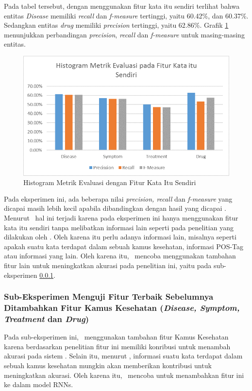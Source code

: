 	Pada tabel tersebut, dengan menggunakan fitur kata itu sendiri terlihat bahwa entitas \textit{Disease} memiliki \textit{recall} dan \textit{f-measure} tertinggi, yaitu 60.42\%, dan 60.37\%. Sedangkan entitas \textit{drug} memiliki \textit{precision} tertinggi, yaitu 62.86\%. Grafik \ref{fig:own1} menunjukkan perbandingan \textit{precision}, \textit{recall} dan \textit{f-measure} untuk masing-masing entitas.
	
	\begin{figure}
	  \centering
	  \includegraphics[width=0.85\linewidth]{images/histogram00}
	  \caption{Histogram Metrik Evaluasi dengan Fitur Kata Itu Sendiri}
	  \label{fig:own1}
	\end{figure}

	Pada eksperimen ini, ada beberapa nilai \textit{precision, recall} dan \textit{f-measure}  yang dicapai masih lebih kecil apabila dibandingkan dengan hasil yang dicapai \cite{skripsiKakRadit}. Menurut \saya~hal ini terjadi karena pada eksperimen ini hanya menggunakan fitur kata itu sendiri tanpa melibatkan informasi lain seperti pada penelitian yang dilakukan oleh \cite{skripsiKakRadit}. Oleh karena itu perlu adanya informasi lain, misalnya seperti apakah suatu kata terdapat dalam sebuah kamus kesehatan, informasi POS-Tag atau informasi yang lain. Oleh karena itu, \saya~mencoba menggunakan tambahan fitur lain untuk meningkatkan akurasi pada penelitian ini, yaitu pada sub-eksperimen \ref{eks:subeksdict}.
	
	\subsubsection{Sub-Eksperimen Menguji Fitur Terbaik Sebelumnya Ditambahkan Fitur Kamus Kesehatan (\textit{Disease, Symptom, Treatment} dan \textit{Drug})}\label{eks:subeksdict}
	Pada sub-eksperimen ini, \saya~menggunakan tambahan fitur Kamus Kesehatan karena berdasarkan penelitian \cite{skripsiKakRadit} fitur ini memiliki konribusi untuk menambah akurasi pada sistem \mer. Selain itu, menurut \saya, informasi suatu kata terdapat dalam sebuah kamus kesehatan mungkin akan memberikan kontribusi untuk meningkatkan akurasi. Oleh karena itu, \saya~mencoba untuk menambahkan fitur ini ke dalam model RNNs.
	
